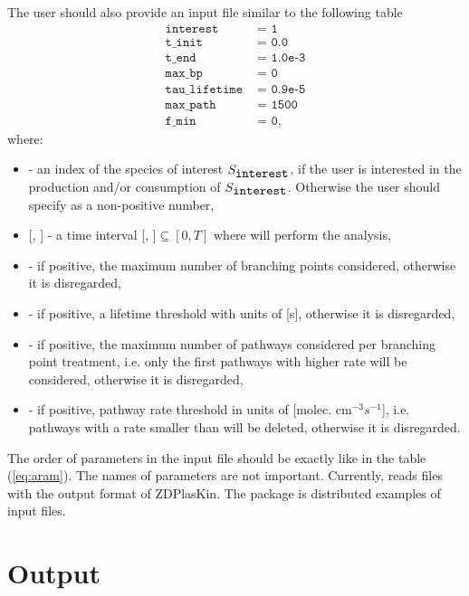 The user should also provide an input file similar to the following table
\begin{align*}
\texttt{interest} &\texttt{ =  1} \\
\texttt{t\_init} & \texttt{ = 0.0}\\ 
\texttt{t\_end} & \texttt{ = 1.0e-3}\\ 
\texttt{max\_bp} & \texttt{ = 0}\\ \label{eq:aram} \tag{*} 
\texttt{tau\_lifetime} & \texttt{ = 0.9e-5}\\ 
\texttt{max\_path} & \texttt{ = 1500}\\
\texttt{f\_min} & \texttt{ = 0,}
\end{align*}
where:  
\begin{itemize}
\item{ - an index of the species of interest $S_{\verb"interest"}$, if the user is interested in the production and/or consumption of $S_{\verb"interest"}$.  Otherwise the user should specify  as a non-positive number,}
\item{[, ] - a time interval [, ]$\subseteq[0,T]$ where 
\pump{} will perform the analysis,}
\item{ - if positive, the maximum number of branching points considered, otherwise it is disregarded,}
\item{ - if positive, a lifetime threshold with units of [s], otherwise it is disregarded,}
\item{ - if positive, the maximum number of pathways considered per branching point treatment, i.e. only the first  pathways with higher rate will be considered, otherwise it is disregarded,}
\item{ - if positive, pathway rate threshold in units of [molec. cm$^{-3}$$s^{-1}$], i.e. pathways with a rate smaller than  will be deleted, otherwise it is disregarded.}
\end{itemize}
The order of parameters in the input file should be exactly like in the table (\ref{eq:aram}). The names of parameters are not important. Currently, \pump{} 
reads files with the output format of ZDPlasKin. The \pump{} package 
is distributed examples of input files. 


\section{Output}
\label{sec_3_2}

